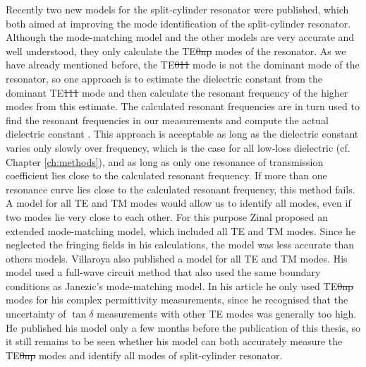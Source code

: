 Recently two new models for the split-cylinder resonator were published, which both aimed at improving the mode identification of the split-cylinder resonator. Although the mode-matching model and the other models are very accurate and well understood, they only calculate the TE\st{0np} modes of the resonator. As we have already mentioned before, the TE\st{011} mode is not the dominant mode of the resonator, so one approach is to estimate the dielectric constant from the dominant TE\st{111} mode and then calculate the resonant frequency of the higher modes from this estimate. The calculated resonant frequencies are in turn used to find the resonant frequencies in our measurements and compute the actual dielectric constant \cite{janezicarz}. This approach is acceptable as long as the dielectric constant varies only slowly over frequency, which is the case for all low-loss dielectric (cf. Chapter \ref{ch:methods}), and as long as only one resonance of transmission coefficient lies close to the calculated resonant frequency. If more than one resonance curve lies close to the calculated resonant frequency, this method fails. A model for all TE and TM modes would allow us to identify all modes, even if two modes lie very close to each other. For this purpose Zinal \cite{zinal} proposed an extended mode-matching model, which included all TE and TM modes. Since he neglected the fringing fields in his calculations, the model was less accurate than others models. Villaroya \cite{villaroya1,villaroya2} also published a model for all TE and TM modes. His model used a full-wave circuit method that also used the same boundary conditions as Janezic's mode-matching model. In his article he only used TE\st{0np} modes for his complex permittivity measurements, since he recognised that the uncertainty of $\tan\delta$ measurements with other TE modes was generally too high. He published his model only a few months before the publication of this thesis, so it still remains to be seen whether his model can both accurately measure the TE\st{0np} modes and identify all modes of split-cylinder resonator.
